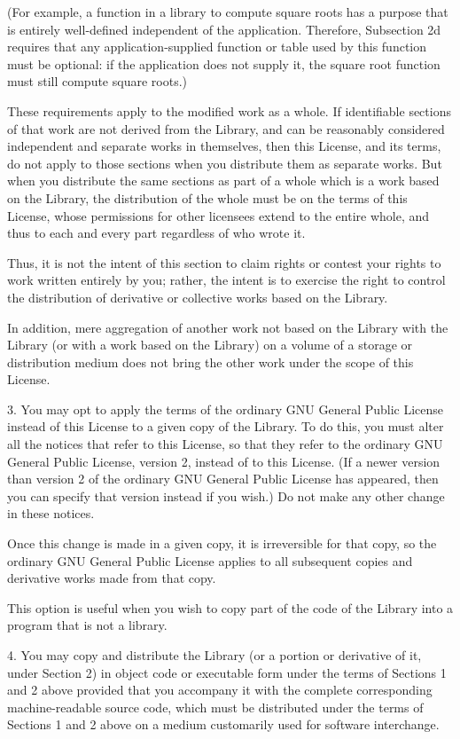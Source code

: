   (For example, a function in a library to compute square roots has
  a purpose that is entirely well-defined independent of the
  application.  Therefore, Subsection 2d requires that any
  application-supplied function or table used by this function must
  be optional: if the application does not supply it, the square
  root function must still compute square roots.)

These requirements apply to the modified work as a whole.  If
identifiable sections of that work are not derived from the Library,
and can be reasonably considered independent and separate works in
themselves, then this License, and its terms, do not apply to those
sections when you distribute them as separate works.  But when you
distribute the same sections as part of a whole which is a work based
on the Library, the distribution of the whole must be on the terms of
this License, whose permissions for other licensees extend to the
entire whole, and thus to each and every part regardless of who wrote
it.

Thus, it is not the intent of this section to claim rights or contest
your rights to work written entirely by you; rather, the intent is to
exercise the right to control the distribution of derivative or
collective works based on the Library.

In addition, mere aggregation of another work not based on the Library
with the Library (or with a work based on the Library) on a volume of
a storage or distribution medium does not bring the other work under
the scope of this License.

3. You may opt to apply the terms of the ordinary GNU General Public License
instead of this License to a given copy of the Library.  To do this, you must
alter all the notices that refer to this License, so that they refer to the
ordinary GNU General Public License, version 2, instead of to this License.
(If a newer version than version 2 of the ordinary GNU General Public License
has appeared, then you can specify that version instead if you wish.)  Do not
make any other change in these notices.

Once this change is made in a given copy, it is irreversible for that copy,
so the ordinary GNU General Public License applies to all subsequent copies
and derivative works made from that copy.

This option is useful when you wish to copy part of the code of the Library
into a program that is not a library.

4. You may copy and distribute the Library (or a portion or derivative of it,
under Section 2) in object code or executable form under the terms of
Sections 1 and 2 above provided that you accompany it with the complete
corresponding machine-readable source code, which must be distributed under
the terms of Sections 1 and 2 above on a medium customarily used for software
interchange.

